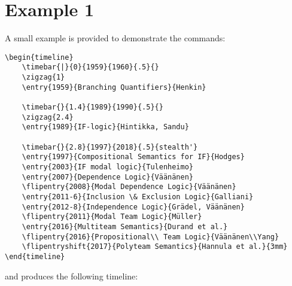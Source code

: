 \documentclass{article}
\begin{document}
\section{Example 1}
A small example is provided to demonstrate the commands:

\begin{lstlisting}
\begin{timeline}
 	\timebar{|}{0}{1959}{1960}{.5}{}
	\zigzag{1}
	\entry{1959}{Branching Quantifiers}{Henkin}
  	
	\timebar{}{1.4}{1989}{1990}{.5}{}
	\zigzag{2.4}
	\entry{1989}{IF-logic}{Hintikka, Sandu}

	\timebar{}{2.8}{1997}{2018}{.5}{stealth'}
	\entry{1997}{Compositional Semantics for IF}{Hodges}
	\entry{2003}{IF modal logic}{Tulenheimo}
	\entry{2007}{Dependence Logic}{Väänänen}
	\flipentry{2008}{Modal Dependence Logic}{Väänänen}
	\entry{2011-6}{Inclusion \& Exclusion Logic}{Galliani}
	\entry{2012-8}{Independence Logic}{Grädel, Väänänen}
	\flipentry{2011}{Modal Team Logic}{Müller}
	\entry{2016}{Multiteam Semantics}{Durand et al.}
	\flipentry{2016}{Propositional\\ Team Logic}{Väänänen\\Yang}
	\flipentryshift{2017}{Polyteam Semantics}{Hannula et al.}{3mm}
\end{timeline}
\end{lstlisting}
and produces the following timeline:


	\begin{timeline}
	  	
	
  	\end{timeline}
  	
\end{document}
